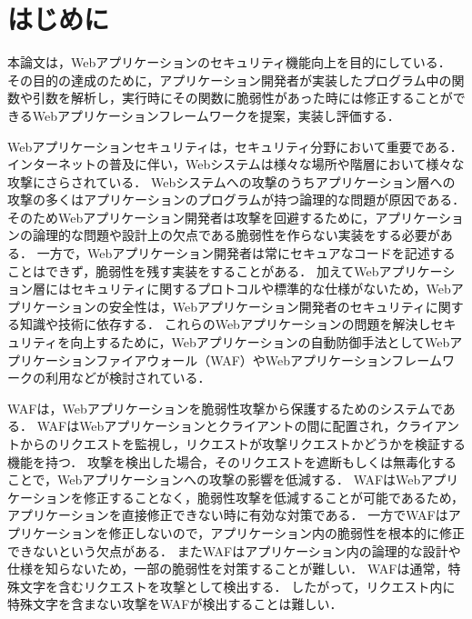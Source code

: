 \documentclass[a4paper,12pt]{jreport}
\begin{document}
\chapter{はじめに}
本論文は，Webアプリケーションのセキュリティ機能向上を目的にしている．
その目的の達成のために，アプリケーション開発者が実装したプログラム中の関数や引数を解析し，実行時にその関数に脆弱性があった時には修正することができるWebアプリケーションフレームワークを提案，実装し評価する．

Webアプリケーションセキュリティは，セキュリティ分野において重要である．
インターネットの普及に伴い，Webシステムは様々な場所や階層において様々な攻撃にさらされている．
Webシステムへの攻撃のうちアプリケーション層への攻撃の多くはアプリケーションのプログラムが持つ論理的な問題が原因である．
そのためWebアプリケーション開発者は攻撃を回避するために，アプリケーションの論理的な問題や設計上の欠点である脆弱性を作らない実装をする必要がある．
一方で，Webアプリケーション開発者は常にセキュアなコードを記述することはできず，脆弱性を残す実装をすることがある．
加えてWebアプリケーション層にはセキュリティに関するプロトコルや標準的な仕様がないため，Webアプリケーションの安全性は，Webアプリケーション開発者のセキュリティに関する知識や技術に依存する．
これらのWebアプリケーションの問題を解決しセキュリティを向上するために，Webアプリケーションの自動防御手法としてWebアプリケーションファイアウォール（WAF）やWebアプリケーションフレームワークの利用などが検討されている．

WAFは，Webアプリケーションを脆弱性攻撃から保護するためのシステムである．
WAFはWebアプリケーションとクライアントの間に配置され，クライアントからのリクエストを監視し，リクエストが攻撃リクエストかどうかを検証する機能を持つ．
攻撃を検出した場合，そのリクエストを遮断もしくは無毒化することで，Webアプリケーションへの攻撃の影響を低減する．
WAFはWebアプリケーションを修正することなく，脆弱性攻撃を低減することが可能であるため，アプリケーションを直接修正できない時に有効な対策である．
一方でWAFはアプリケーションを修正しないので，アプリケーション内の脆弱性を根本的に修正できないという欠点がある．
またWAFはアプリケーション内の論理的な設計や仕様を知らないため，一部の脆弱性を対策することが難しい．
WAFは通常，特殊文字を含むリクエストを攻撃として検出する．
したがって，リクエスト内に特殊文字を含まない攻撃をWAFが検出することは難しい．
\end{document}
